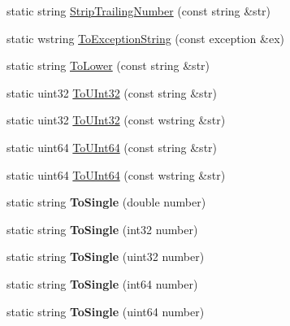 \begin{DoxyCompactItemize}
\item 
static string \hyperlink{class_gost_crypt_1_1_string_converter_a6afb637684718b77737ca013b51a26db}{Strip\+Trailing\+Number} (const string \&str)
\item 
static wstring \hyperlink{class_gost_crypt_1_1_string_converter_a3ffac80d302898c47b5eeccbc4b5b424}{To\+Exception\+String} (const exception \&ex)
\item 
static string \hyperlink{class_gost_crypt_1_1_string_converter_ab3981bf6da41d9e6785b8fd02cda2d9e}{To\+Lower} (const string \&str)
\item 
static uint32 \hyperlink{class_gost_crypt_1_1_string_converter_a339be9ee8d5d59aa831e76b12dbbb21f}{To\+U\+Int32} (const string \&str)
\item 
static uint32 \hyperlink{class_gost_crypt_1_1_string_converter_a23476c43767a021a338e150d91380caa}{To\+U\+Int32} (const wstring \&str)
\item 
static uint64 \hyperlink{class_gost_crypt_1_1_string_converter_ada0fc4768185c72b861c48904da33d56}{To\+U\+Int64} (const string \&str)
\item 
static uint64 \hyperlink{class_gost_crypt_1_1_string_converter_a8ea2fe72a7ffaca52b4915607e64f307}{To\+U\+Int64} (const wstring \&str)
\item 
\mbox{\label{class_gost_crypt_1_1_string_converter_a42673028c655f57ae467b76d01a5b768}} 
static string {\bfseries To\+Single} (double number)
\item 
\mbox{\label{class_gost_crypt_1_1_string_converter_a65240ba57e2220e33fe342c88f0fc07b}} 
static string {\bfseries To\+Single} (int32 number)
\item 
\mbox{\label{class_gost_crypt_1_1_string_converter_a44b44c35dd9d5ba1b42e8cc973129313}} 
static string {\bfseries To\+Single} (uint32 number)
\item 
\mbox{\label{class_gost_crypt_1_1_string_converter_a38fccac3ca369a4fec46da5489a9abe7}} 
static string {\bfseries To\+Single} (int64 number)
\item 
\mbox{\label{class_gost_crypt_1_1_string_converter_a1c9d44f80a26d27e800034205db7fad3}} 
static string {\bfseries To\+Single} (uint64 number)

\end{DoxyCompactItemize}
